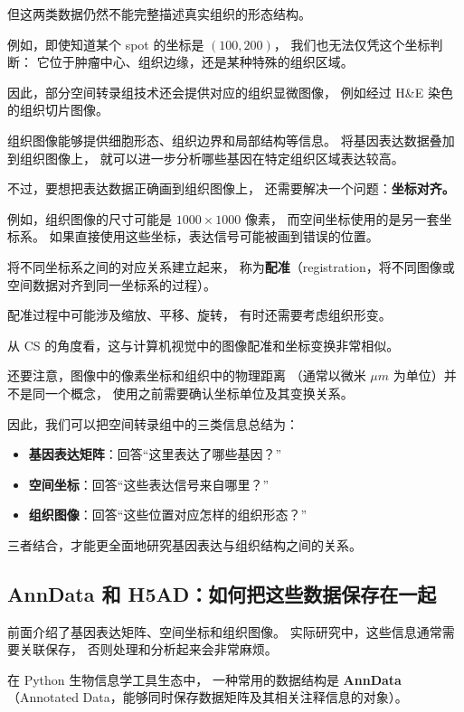 \documentclass[UTF8,a4paper,11pt,fontset=fandol]{ctexart}
\newcommand{\term}[2]{{\color{accent}\textbf{#1}}（#2）}
\begin{document}
但这两类数据仍然不能完整描述真实组织的形态结构。

例如，即使知道某个 spot 的坐标是 $(100,200)$，
我们也无法仅凭这个坐标判断：
它位于肿瘤中心、组织边缘，还是某种特殊的组织区域。

因此，部分空间转录组技术还会提供对应的组织显微图像，
例如经过 H\&E 染色的组织切片图像。

组织图像能够提供细胞形态、组织边界和局部结构等信息。
将基因表达数据叠加到组织图像上，
就可以进一步分析哪些基因在特定组织区域表达较高。

不过，要想把表达数据正确画到组织图像上，
还需要解决一个问题：\textbf{坐标对齐。}

例如，组织图像的尺寸可能是 $1000\times1000$ 像素，
而空间坐标使用的是另一套坐标系。
如果直接使用这些坐标，表达信号可能被画到错误的位置。

将不同坐标系之间的对应关系建立起来，
称为\term{配准}{registration，将不同图像或空间数据对齐到同一坐标系的过程}。

配准过程中可能涉及缩放、平移、旋转，
有时还需要考虑组织形变。

从 CS 的角度看，这与计算机视觉中的图像配准和坐标变换非常相似。

还要注意，图像中的像素坐标和组织中的物理距离
（通常以微米 $\mu m$ 为单位）并不是同一个概念，
使用之前需要确认坐标单位及其变换关系。

因此，我们可以把空间转录组中的三类信息总结为：

\begin{itemize}
  \item \textbf{基因表达矩阵}：回答“这里表达了哪些基因？”
  \item \textbf{空间坐标}：回答“这些表达信号来自哪里？”
  \item \textbf{组织图像}：回答“这些位置对应怎样的组织形态？”
\end{itemize}

三者结合，才能更全面地研究基因表达与组织结构之间的关系。


\subsection{AnnData 和 H5AD：如何把这些数据保存在一起}

前面介绍了基因表达矩阵、空间坐标和组织图像。
实际研究中，这些信息通常需要关联保存，
否则处理和分析起来会非常麻烦。

在 Python 生物信息学工具生态中，
一种常用的数据结构是 \term{AnnData}
{Annotated Data，能够同时保存数据矩阵及其相关注释信息的对象}。
\end{document}
